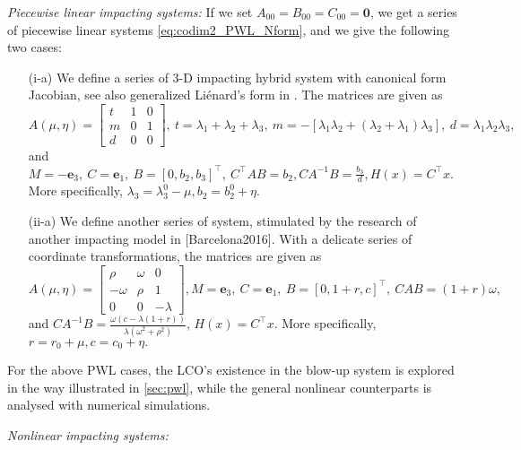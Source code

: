 \emph{Piecewise linear impacting systems:} 
If we set $A_{00} =  B_{00} = C_{00} = \mathbf{0}$, we get a series of piecewise linear systems  \eqref{eq:codim2_PWL_Nform}, and we give the following two cases:
%
\begin{enumerate}
	\item[(i-a)]  \label{itm:3D_SN_case}
	We define a series of 3-D impacting hybrid system with canonical form Jacobian, see also generalized Li\'enard's
	form in \cite{HoCh23}.
	The matrices are given as
	\[ A(\mu, \eta) =
	\begin{bmatrix}
		t  & 1 & 0 \\ m & 0 & 1 \\ d & 0 & 0
	\end{bmatrix}, ~ t = \lambda_1+ \lambda_2 +\lambda_3 , ~ m = -\left[ \lambda_1 \lambda_2 + (\lambda_2 +  \lambda_1)
	\lambda_3  \right], ~ d = \lambda_1 \lambda_2 \lambda_3,
	\]
	and $ \displaystyle M = -\mathbf{e}_3,~ C = \mathbf{e}_1,~
	B = [0, b_2, b_3]^{\top},~
	C^{\top}AB = b_2,
	CA^{-1}B = \frac{b_3}{d},
	H(x) = C^{\top} x$.
	More specifically,
	$
	\lambda_3 = \lambda_3^0 - \mu, b_2 = b_2^0 + \eta.
	$
	\item[(ii-a)] \label{itm:3D_PD_case}
	We define another series of system, stimulated by the research of another impacting model in [Barcelona2016].
	With a delicate series of coordinate transformations, the matrices are given as
	$$ \displaystyle A(\mu, \eta) =
	\begin{bmatrix}
		\rho  & \omega & 0 \\ -\omega & \rho & 1 \\ 0 & 0 & -\lambda
	\end{bmatrix},
	M = \mathbf{e}_3, ~ C = \mathbf{e}_1,~ B = [0, 1+r , c ]^{\top},~CAB = (1 + r)\omega,
	$$
	and $ \displaystyle
	CA^{-1}B = \frac{\omega(c-\lambda(1+r)) }{\lambda(\omega^2 + \rho^2)}$, $H(x) = C^{\top}x$. More specifically,
	$r = r_0 + \mu, c = c_0 + \eta.$
\end{enumerate}
%
For the above PWL cases, the LCO's existence in the blow-up system is explored in the way illustrated in
\cref{sec:pwl}, while the general nonlinear counterparts is analysed with numerical simulations.
%

\emph{Nonlinear impacting systems:} 

